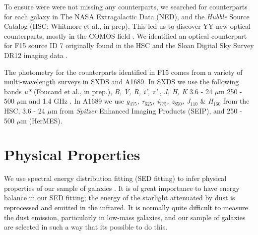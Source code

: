 \documentclass[preprint,natbib209]{aastex}
\begin{document}
To ensure were were not missing any counterparts, we searched for counterparts for each galaxy in The NASA Extragalactic Data (NED), and
the \textit{Hubble} Source Catalog (HSC; Whitmore et al., in prep). This led us to discover YY new optical counterparts, 
mostly in the COMOS field \citep{COSMOS}. %
We identified an optical counterpart for F15 source ID 7 originally found in the HSC and the Sloan Digital Sky Survey \citep[SDSS;][]{york2000} 
DR12 \citep{alam15} imaging data \citep{fukugita96, gunn98, hogg01, smith02, pier03, ivezic04, gunn06, tucker06, padmanabhan08, doi10}.

The photometry for the counterparts identified in F15 comes from a variety of multi-wavelength surveys in SXDS and A1689.
In SXDS we use the following bands \textit{u*} (Foucaud et al., in prep.), \textit{B, V, R, i', z'} \citep{furusawa08},
\textit{J, H, K} \citep[UKIDSS;\footnotemark][]{lawrence07} 3.6 - 24 $\mu$m \citep[SWIRE, SpUDS, SEDS;][]{lonsdale03, ashby13}
250 - 500 $\mu$m \citep[HerMES;][]{oliver12, smith12, wang14} and 1.4 GHz \citep{simpson06}.
In A1689 we use \textit{g$_{475}$, r$_{625}$, i$_{775}$, z$_{850}$, J$_{110}$} \& \textit{H}$_{160}$ from the HSC,
 3.6 - 24 $\mu$m from \textit{Spitzer} Enhanced Imaging Products (SEIP), and 250 - 500 $\mu$m (HerMES).


\section{Physical Properties}
\label{sec:analysis}

We use spectral energy distribution fitting (SED fitting) to infer physical properties of our sample of galaxies \citep[for a recent review of SED fitting see][]{conroy13}. It is of great importance to have energy balance in our SED fitting; the energy of the starlight attenuated by dust is reprocessed and emitted in the infrared. It is normally quite difficult to measure the dust emission, particularly in low-mass galaxies, and our sample of galaxies are selected in such a way that its possible to do this.
\end{document}
